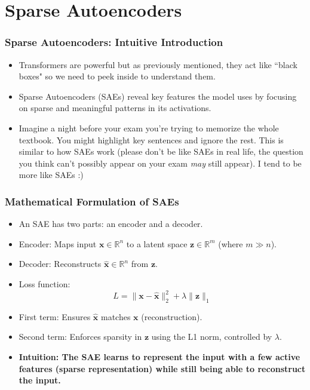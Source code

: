 \documentclass{beamer}
\begin{document}
\section{Sparse Autoencoders}

\begin{frame}
\frametitle{Sparse Autoencoders: Intuitive Introduction}
\begin{itemize}
    \item Transformers are powerful but as previously mentioned, they act like ``black boxes" so we need to peek inside to understand them.
    \item Sparse Autoencoders (SAEs) reveal key features the model uses by focusing on sparse and meaningful patterns in its activations.
    \item Imagine a night before your exam you're trying to memorize the whole textbook. You might highlight key sentences and ignore the rest. This is similar to how SAEs work (please don't be like SAEs in real life, the question you think can't possibly appear on your exam \textit{may} still appear). I tend to be more like SAEs :)
\end{itemize}
\end{frame}

\begin{frame}
\frametitle{Mathematical Formulation of SAEs}
\begin{itemize}
    \item An SAE has two parts: an encoder and a decoder.
    \item Encoder: Maps input $\mathbf{x} \in \mathbb{R}^n$ to a latent space $\mathbf{z} \in \mathbb{R}^m$ (where $m \gg n$).
    \item Decoder: Reconstructs $\hat{\mathbf{x}} \in \mathbb{R}^n$ from $\mathbf{z}$.
    \item Loss function:
    \[
    L = \| \mathbf{x} - \hat{\mathbf{x}} \|_2^2 + \lambda \| \mathbf{z} \|_1
    \]
    \item First term: Ensures $\hat{\mathbf{x}}$ matches $\mathbf{x}$ (reconstruction).
    \item Second term: Enforces sparsity in $\mathbf{z}$ using the L1 norm, controlled by $\lambda$.
    \item \textbf{Intuition: The SAE learns to represent the input with a few active features (sparse representation) while still being able to reconstruct the input.}
\end{itemize}
\end{frame}
\end{document}
